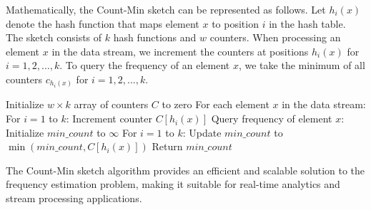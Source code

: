 \documentclass[12pt]{book} %
\begin{document}
Mathematically, the Count-Min sketch can be represented as follows. Let \(h_i(x)\) denote the hash function that maps element \(x\) to position \(i\) in the hash table. The sketch consists of \(k\) hash functions and \(w\) counters. When processing an element \(x\) in the data stream, we increment the counters at positions \(h_i(x)\) for \(i = 1, 2, ..., k\). To query the frequency of an element \(x\), we take the minimum of all counters \(c_{h_i(x)}\) for \(i = 1, 2, ..., k\). 
\FloatBarrier
\begin{algorithm}
\caption{Count-Min Sketch Algorithm}\label{countmin}
\begin{algorithmic}[1]
\State Initialize \(w \times k\) array of counters \(C\) to zero
\State For each element \(x\) in the data stream:
\State \hspace{\algorithmicindent} For \(i = 1\) to \(k\):
\State \hspace{\algorithmicindent} \hspace{\algorithmicindent} Increment counter \(C[h_i(x)]\)
\State Query frequency of element \(x\):
\State \hspace{\algorithmicindent} Initialize \(min\_count\) to \(\infty\)
\State \hspace{\algorithmicindent} For \(i = 1\) to \(k\):
\State \hspace{\algorithmicindent} \hspace{\algorithmicindent} Update \(min\_count\) to \(\min(min\_count, C[h_i(x)])\)
\State \hspace{\algorithmicindent} Return \(min\_count\)
\end{algorithmic}
\end{algorithm}
\FloatBarrier

The Count-Min sketch algorithm provides an efficient and scalable solution to the frequency estimation problem, making it suitable for real-time analytics and stream processing applications.
\end{document}
